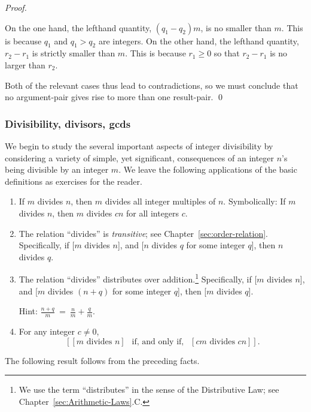 \begin{proof}
\begin{enumerate}
On the one hand, the lefthand quantity, $(q_1 - q_2) m$, is no smaller
than $m$.  This is because $q_1$ and $q_1 > q_2$ are integers.  On the
other hand, the lefthand quantity, $r_2 - r_1$ is strictly smaller
than $m$.  This is because $r_1 \geq 0$ so that $r_2 - r_1$ is no
larger than $r_2$.
\end{enumerate}
Both of the relevant cases thus lead to contradictions, so we must
conclude that no argument-pair gives rise to more than one
result-pair.  \qed
\end{proof}


\subsubsection{Divisibility, divisors, {\sc gcd}s}
\label{sec:divisibility+GCD}

We begin to study the several important aspects of integer
divisibility by considering a variety of simple, yet significant,
consequences of an integer $n$'s being divisible by an integer $m$.
We leave the following applications of the basic definitions as
exercises for the reader.

\begin{prop}
\label{thm:basic-divisibility}
\begin{enumerate}
\item
If $m$ divides $n$, then $m$ divides all integer multiples of $n$.
Symbolically: If $m$ divides $n$, then $m$ divides $cn$ for all
integers $c$.
\item
The relation ``divides'' is {\em transitive}; see
Chapter~\ref{sec:order-relation}.  Specifically, if [$m$ divides $n$],
and [$n$ divides $q$ for some integer $q$], then $n$ divides $q$.
\item
The relation ``divides'' distributes over addition.\footnote{We use
  the term ``distributes'' in the sense of the Distributive Law; see
  Chapter~\ref{sec:Arithmetic-Laws}.C.}  Specifically, if [$m$ divides
  $n$], and [$m$ divides $(n+q)$ for some integer $q$], then [$m$
  divides $q$].

Hint: $\displaystyle \frac{n+q}{m} \ = \ \frac{n}{m} + \frac{q}{m}$.

\item 
For any integer $c \neq 0$,
\[ \left[[m \mbox{ divides } n] \ \ \mbox{ if, and only if, } \ \ [cm
    \mbox{ divides } cn] \right]. \]
\end{enumerate}
\end{prop}

The following result follows from the preceding facts.

